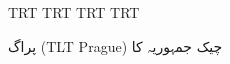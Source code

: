 \documentclass{article}
\def\textlatin#1{\bgroup\textdir TLT #1\egroup}
\begin{document}
\pagedir TRT \bodydir TRT \pardir TRT \textdir TRT

\noto
{}
پراگ (\textlatin{Prague}) چیک جمہوریہ کا%
\end{document}
